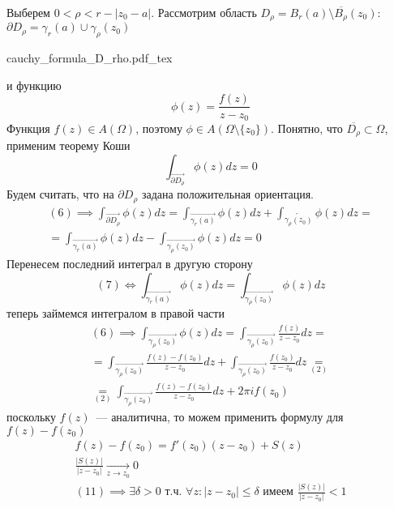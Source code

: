 \documentclass[main]{subfiles}
\begin{document}
\begin{longProof}[теоремы]
    Выберем $0< \rho < r - |z_0 - a|$.
    Рассмотрим область $D_\rho = B_r(a) \setminus \overline{B_\rho}(z_0)$: $\partial D_\rho = \gamma_r(a) \cup \gamma_\rho(z_0)$
    \begin{center}
        {cauchy_formula_D_rho.pdf_tex}
    \end{center}
    и функцию
    \[\phi (z) = \frac{f(z)}{z - z_0} \tag{5}\]
    Функция $f(z) \in A(\Omega)$, поэтому  $\phi \in A(\Omega \setminus \{z_0\})$.
    Понятно, что $\overline{D_\rho} \subset \Omega$, применим теорему Коши
    \[\int_{\overrightarrow{\partial D_\rho}} \phi(z) dz = 0 \tag{6}\]
    Будем считать, что на $\partial D_\rho$ задана положительная ориентация.
    \begin{multline*}
        (6) \implies \int_{\overrightarrow{\partial D_\rho}} \phi(z) dz = \int_{\overrightarrow{\gamma_r(a)}} \phi(z) dz + \int_{\overleftarrow{\gamma_\rho(z_0)}} \phi(z) dz = \\
        = \int_{\overrightarrow{\gamma_r(a)}} \phi(z) dz  - \int_{\overrightarrow{\gamma_\rho(z_0)}} \phi(z) dz = 0 \tag{7}
    \end{multline*}
    Перенесем последний интеграл в другую сторону
    \[(7) \Leftrightarrow  \int_{\overrightarrow{\gamma_r(a)}} \phi(z) dz  = \int_{\overrightarrow{\gamma_\rho(z_0)}} \phi(z) dz \tag{8}\]
    теперь займемся интегралом в правой части
    \begin{multline*}
        (6) \implies \int_{\overrightarrow{\gamma_\rho(z_0)}} \phi(z) dz = \int_{\overrightarrow{\gamma_\rho(z_0)}}  \frac{f(z)}{z - z_0} dz = \\
        = \int_{\overrightarrow{\gamma_\rho(z_0)}} \frac{f(z) - f(z_0)}{z - z_0} dz + \int_{\overrightarrow{\gamma_\rho(z_0)}} \frac{f(z_0)}{z - z_0} dz \underset{(2)}{=} \\
        \underset{(2)}{=} \int_{\overrightarrow{\gamma_\rho(z_0)}} \frac{f(z) - f(z_0)}{z - z_0} dz + 2 \pi i f(z_0) \tag{9}
    \end{multline*}
    поскольку $f(z)$~--- аналитична, то можем применить формулу для $f(z) - f(z_0)$
    \begin{gather*}
        f(z) - f(z_0) = f'(z_0) (z- z_0) + S(z) \tag{10} \\
        \frac{|S(z)|}{|z-z_0|} \xrightarrow[z \to z_0]{} 0 \tag{11} \\
        (11) \implies \exists \delta >0 \text{ т.ч. } \forall z: |z-z_0| \le \delta \text{ имеем } \frac{|S(z)|}{|z-z_0|} < 1 \tag{12}

\end{gather*}
\end{longProof}
\end{document}
